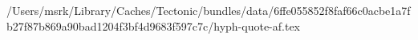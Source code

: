 /Users/msrk/Library/Caches/Tectonic/bundles/data/6ffe055852f8faf66c0acbe1a7fb27f87b869a90bad1204f3bf4d9683f597c7c/hyph-quote-af.tex